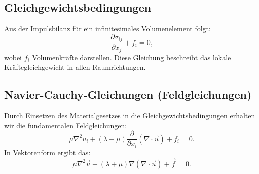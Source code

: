\subsection{Gleichgewichtsbedingungen}
Aus der Impulsbilanz für ein infinitesimales Volumenelement folgt:
\begin{equation}
	\frac{\partial \sigma_{ij}}{\partial x_j} + f_i =
	0,
\end{equation}
wobei $f_i$ Volumenkräfte darstellen. 
Diese Gleichung beschreibt das lokale Kräftegleichgewicht in allen Raumrichtungen.

\subsection{Navier-Cauchy-Gleichungen (Feldgleichungen)}
Durch Einsetzen des Materialgesetzes in die Gleichgewichtsbedingungen erhalten wir die fundamentalen Feldgleichungen:
\begin{equation}
	\mu \nabla^2 u_i + (\lambda + \mu) \frac{\partial}{\partial x_i} (\nabla \cdot \vec{u}) + f_i =
	0.
\end{equation}
In Vektorenform ergibt das:
\begin{equation}
	\mu \nabla^2 \vec{u} + (\lambda + \mu) \nabla (\nabla \cdot \vec{u}) + \vec{f} = 
	0.
\end{equation}

